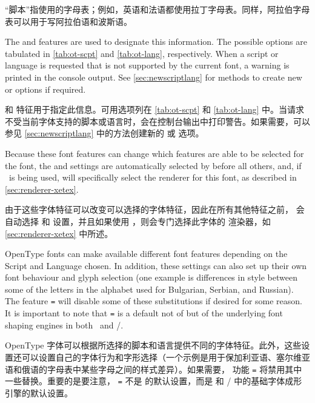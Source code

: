 \documentclass[a4paper]{l3doc}
\begin{document}
“脚本”指使用的字母表；例如，英语和法语都使用拉丁字母表。同样，阿拉伯字母表可以用于写阿拉伯语和波斯语。

The
 and  features are used to designate this information. The possible options are
tabulated in \vref{tab:ot-scpt} and \vref{tab:ot-lang},
respectively. When a script or language is requested that is not
supported by the current font, a warning is printed in the console output.
See \vref{sec:newscriptlang} for methods to create new  or 
options if required.

 和  特征用于指定此信息。可用选项列在 \vref{tab:ot-scpt} 和 \vref{tab:ot-lang} 中。当请求不受当前字体支持的脚本或语言时，会在控制台输出中打印警告。如果需要，可以参见 \vref{sec:newscriptlang} 中的方法创建新的  或  选项。

Because these font features can
change which features are able to be selected for the font, the  and 
settings are automatically selected
by  before all others, and, if \XeTeX\ is being used, will
specifically select the 
renderer for this font, as described in \vref{sec:renderer-xetex}.

由于这些字体特征可以改变可以选择的字体特征，因此在所有其他特征之前， 会自动选择  和  设置，并且如果使用 \XeTeX，则会专门选择此字体的  渲染器，如 \vref{sec:renderer-xetex} 中所述。

OpenType fonts can make available different font features depending on the Script and
Language chosen.
In addition, these settings can also set up their own font behaviour
and glyph selection (one example is differences in style between some of the letters in the
alphabet used for Bulgarian, Serbian, and Russian).
The  feature  \texttt{=}  will disable some of
these substitutions if desired for some reason.
It is important to note that  \texttt{=}  is a default not of 
but of the underlying font shaping engines in both \XeTeX\ and \LuaTeX/.

OpenType 字体可以根据所选择的脚本和语言提供不同的字体特征。此外，这些设置还可以设置自己的字体行为和字形选择（一个示例是用于保加利亚语、塞尔维亚语和俄语的字母表中某些字母之间的样式差异）。如果需要， 功能  \texttt{=}  将禁用其中一些替换。重要的是要注意， \texttt{=}  不是  的默认设置，而是 \XeTeX 和 \LuaTeX/ 中的基础字体成形引擎的默认设置。
\end{document}
